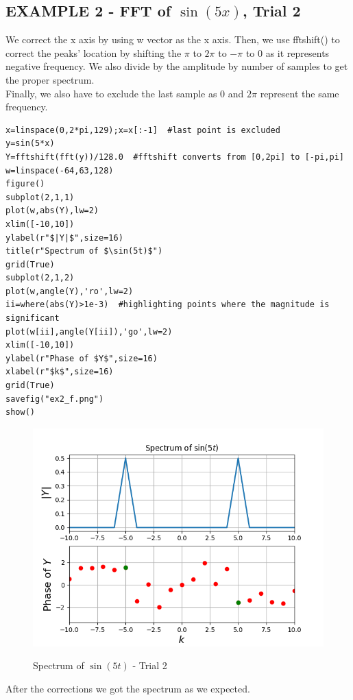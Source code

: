 \documentclass[11pt, a4paper]{article}
\begin{document}
\subsection{EXAMPLE 2 - FFT of $\sin(5x)$, Trial 2} 
{
We correct the x axis by using w vector as the x axis. Then, we use fftshift() to correct the peaks' location by shifting the  $\pi$ to $2\pi$ to $-\pi$ to $0$ as it represents negative frequency. We also divide by the amplitude by number of samples to get the proper spectrum.
\\Finally, we also have to exclude the last sample as 0 and $2\pi$ represent the same frequency.
}
\begin{verbatim}
x=linspace(0,2*pi,129);x=x[:-1]  #last point is excluded
y=sin(5*x)
Y=fftshift(fft(y))/128.0  #fftshift converts from [0,2pi] to [-pi,pi] 
w=linspace(-64,63,128)
figure()
subplot(2,1,1)
plot(w,abs(Y),lw=2)
xlim([-10,10])
ylabel(r"$|Y|$",size=16)
title(r"Spectrum of $\sin(5t)$")
grid(True)
subplot(2,1,2)
plot(w,angle(Y),'ro',lw=2)
ii=where(abs(Y)>1e-3)  #highlighting points where the magnitude is significant
plot(w[ii],angle(Y[ii]),'go',lw=2)
xlim([-10,10])
ylabel(r"Phase of $Y$",size=16)
xlabel(r"$k$",size=16)
grid(True)
savefig("ex2_f.png")
show()
\end{verbatim}
\begin{figure}[H]
   	\centering
   	\includegraphics[scale=0.8]{ex2_f.png}
   	\label{fig:ex2_f}
   	\caption{Spectrum of $\sin(5t)$ - Trial 2}
\end{figure}
{
After the corrections we got the spectrum as we expected.
}
\end{document}

